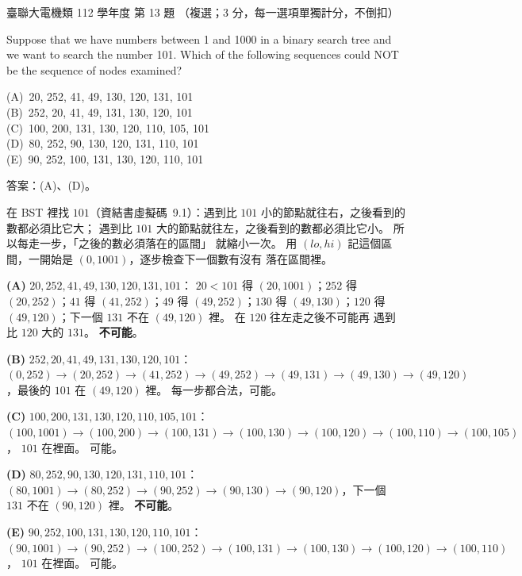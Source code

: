 \begin{pastexam}[label={px:ust-112-ee-ds-13}]{臺聯大電機類 112 學年度 第 13 題}
（複選；3 分，每一選項單獨計分，不倒扣）

Suppose that we have numbers between 1 and 1000 in a binary search tree and we want to search the
number 101. Which of the following sequences could NOT be the sequence of nodes examined?

(A)~20, 252, 41, 49, 130, 120, 131, 101\\
(B)~252, 20, 41, 49, 131, 130, 120, 101\\
(C)~100, 200, 131, 130, 120, 110, 105, 101\\
(D)~80, 252, 90, 130, 120, 131, 110, 101\\
(E)~90, 252, 100, 131, 130, 120, 110, 101
\end{pastexam}

\begin{pastsoln}
答案：(A)、(D)。

在 BST 裡找 $101$（資結書虛擬碼~9.1）：遇到比 $101$ 小的節點就往右，之後看到的數都必須比它大；
遇到比 $101$ 大的節點就往左，之後看到的數都必須比它小。 所以每走一步，「之後的數必須落在的區間」
就縮小一次。 用 $(\mathit{lo}, \mathit{hi})$ 記這個區間，一開始是 $(0, 1001)$，逐步檢查下一個數有沒有
落在區間裡。

\textbf{(A)} $20, 252, 41, 49, 130, 120, 131, 101$：
$20 < 101$ 得 $(20, 1001)$；$252$ 得 $(20, 252)$；$41$ 得 $(41, 252)$；$49$ 得 $(49, 252)$；$130$ 得
$(49, 130)$；$120$ 得 $(49, 120)$；下一個 $131$ 不在 $(49, 120)$ 裡。 在 $120$ 往左走之後不可能再
遇到比 $120$ 大的 $131$。 \textbf{不可能}。

\textbf{(B)} $252, 20, 41, 49, 131, 130, 120, 101$：
$(0, 252) \to (20, 252) \to (41, 252) \to (49, 252) \to (49, 131) \to (49, 130) \to (49, 120)$，最後的
$101$ 在 $(49, 120)$ 裡。 每一步都合法，可能。

\textbf{(C)} $100, 200, 131, 130, 120, 110, 105, 101$：
$(100, 1001) \to (100, 200) \to (100, 131) \to (100, 130) \to (100, 120) \to (100, 110) \to (100, 105)$，
$101$ 在裡面。 可能。

\textbf{(D)} $80, 252, 90, 130, 120, 131, 110, 101$：
$(80, 1001) \to (80, 252) \to (90, 252) \to (90, 130) \to (90, 120)$，下一個 $131$ 不在
$(90, 120)$ 裡。 \textbf{不可能}。

\textbf{(E)} $90, 252, 100, 131, 130, 120, 110, 101$：
$(90, 1001) \to (90, 252) \to (100, 252) \to (100, 131) \to (100, 130) \to (100, 120) \to (100, 110)$，
$101$ 在裡面。 可能。
\end{pastsoln}
